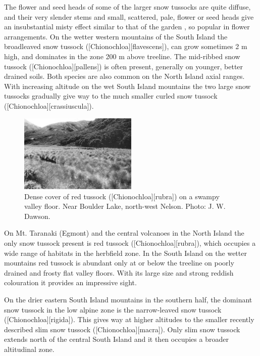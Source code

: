 The flower and seed heads of some of the larger snow tussocks are quite diffuse, and their very slender stems and small, scattered, pale, flower or seed heads give an insubstantial misty effect similar to that of the garden , so popular in flower arrangements.
On the wetter western mountains of the South Island the broadleaved snow tussock ([Chionochloa][flavescens]), can grow sometimes 2 m high, and dominates in the zone 200 m above treeline.
The mid-ribbed snow tussock ([Chionochloa][pallens]) is often present, generally on younger, better drained soils.
Both species are also common on the North Island axial ranges.
With increasing altitude on the wet South Island mountains the two large snow tussocks gradually give way to the much smaller curled snow tussock ([Chionochloa][crassiuscula]).

\begin{figure}
	\includegraphics[width=0.5\textwidth]{graphics/figure97red-tussock.jpg}
	\centering
	\caption[Red tussock]{Dense cover of red tussock ([Chionochloa][rubra]) on a swampy valley floor.
	Near Boulder Lake, north-west Nelson.
	Photo: J. W. Dawson.}%
	\label{fig:97red-tussock}
\end{figure}

On Mt. Taranaki (Egmont) and the central volcanoes in the North Island the only snow tussock present is red tussock ([Chionochloa][rubra]), which occupies a wide range of habitats in the herbfield zone.
In the South Island on the wetter mountains red tussock is abundant only at or below the treeline on poorly drained and frosty flat valley floors.
With its large size and strong reddish colouration it provides an impressive sight.

On the drier eastern South Island mountains in the southern half, the dominant snow tussock in the low alpine zone is the narrow-leaved snow tussock ([Chionochloa][rigida]).
This gives way at higher altitudes to the smaller recently described slim snow tussock ([Chionochloa][macra]).
Only slim snow tussock extends north of the central South Island and it then occupies a broader altitudinal zone.

